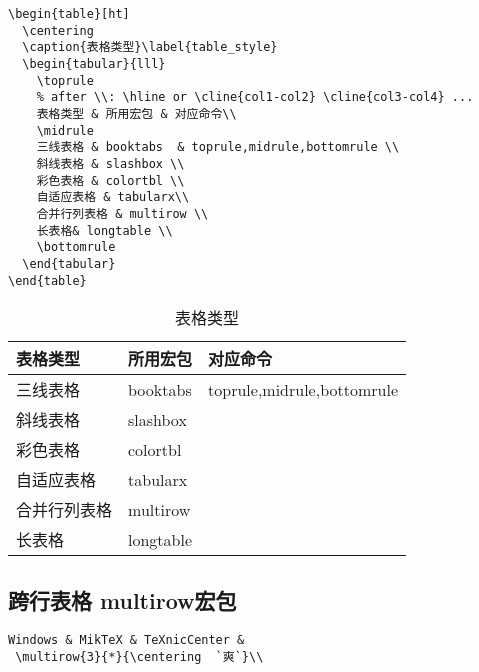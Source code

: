 \begin{lstlisting}
\begin{table}[ht]
  \centering
  \caption{表格类型}\label{table_style}
  \begin{tabular}{lll}
    \toprule
    % after \\: \hline or \cline{col1-col2} \cline{col3-col4} ...
    表格类型 & 所用宏包 & 对应命令\\
    \midrule
    三线表格 & booktabs  & toprule,midrule,bottomrule \\
    斜线表格 & slashbox \\
    彩色表格 & colortbl \\
    自适应表格 & tabularx\\
    合并行列表格 & multirow \\
    长表格& longtable \\
    \bottomrule
  \end{tabular}
\end{table}
\end{lstlisting}
\begin{table}[ht]
  \centering
  \caption{表格类型}\label{table_style}
  \begin{tabular}{lll}
    \toprule
    表格类型 & 所用宏包 & 对应命令\\
    \midrule
    三线表格 & booktabs  & toprule,midrule,bottomrule \\
    斜线表格 & slashbox \\
    彩色表格 & colortbl \\
    自适应表格 & tabularx\\
    合并行列表格 & multirow \\
    长表格& longtable \\
    \bottomrule
  \end{tabular}
\end{table}


\subsection{跨行表格 multirow宏包 }

\begin{lstlisting}[language={[LaTeX]TeX}]
 Windows & MikTeX & TeXnicCenter &
 \multirow{3}{*}{\centering  `爽`}\\
\end{lstlisting}

